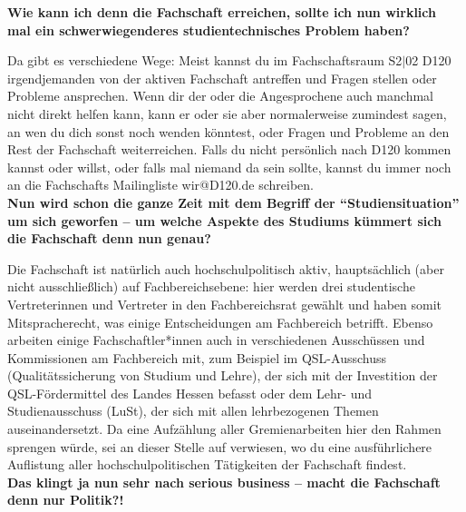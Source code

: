 {    \textbf{Wie kann ich denn die Fachschaft erreichen, sollte ich nun wirklich mal ein schwerwiegenderes studientechnisches Problem haben?}

    Da gibt es verschiedene Wege: Meist kannst du im Fachschaftsraum S2$|$02 D120 irgendjemanden von der aktiven Fachschaft antreffen und Fragen stellen oder Probleme ansprechen. Wenn dir der oder die Angesprochene auch manchmal nicht direkt helfen kann, kann er oder sie aber normalerweise zumindest sagen, an wen du dich sonst noch wenden könntest, oder Fragen und Probleme an den Rest der Fachschaft weiterreichen. Falls du nicht persönlich nach D120 kommen kannst oder willst, oder falls mal niemand da sein sollte, kannst du immer noch an die Fachschafts Mailingliste wir@D120.de schreiben.\\

    \textbf{Nun wird schon die ganze Zeit mit dem Begriff der "`Studiensituation"' um sich geworfen – um welche Aspekte des Studiums kümmert sich die Fachschaft denn nun genau?}

    Die Fachschaft ist natürlich auch hochschulpolitisch aktiv, hauptsächlich (aber nicht ausschließlich) auf Fachbereichsebene: hier werden drei studentische Vertreterinnen und Vertreter in den Fachbereichsrat gewählt und haben somit Mitspracherecht, was einige Entscheidungen am Fachbereich betrifft. Ebenso arbeiten einige Fachschaftler*innen auch in verschiedenen Ausschüssen und Kommissionen am Fachbereich mit, zum Beispiel im QSL-Ausschuss (Qualitätssicherung von Studium und Lehre), der sich mit der Investition der QSL-Fördermittel des Landes Hessen befasst oder dem Lehr- und Studienausschuss (LuSt), der sich mit allen lehrbezogenen Themen auseinandersetzt. Da eine Aufzählung aller Gremienarbeiten hier den Rahmen sprengen würde, sei an dieser Stelle auf \footnotemark[1] verwiesen, wo du eine ausführlichere Auflistung aller hochschulpolitischen Tätigkeiten der Fachschaft findest.\\

    \textbf{Das klingt ja nun sehr nach serious business – macht die Fachschaft denn nur Politik?!}

}
